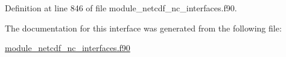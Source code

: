 Definition at line 846 of file module\+\_\+netcdf\+\_\+nc\+\_\+interfaces.\+f90.



The documentation for this interface was generated from the following file\+:\begin{DoxyCompactItemize}
\item 
\hyperlink{module__netcdf__nc__interfaces_8f90}{module\+\_\+netcdf\+\_\+nc\+\_\+interfaces.\+f90}\end{DoxyCompactItemize}
